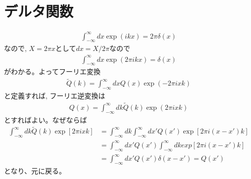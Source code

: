 \documentclass[a4j, 12pt]{ltjarticle}
\begin{document}
    \section{デルタ関数}
    \begin{align}
        \int_{-\infty}^\infty dx \exp\left(ikx\right) = 2\pi\delta(x)
    \end{align}
    なので, $X = 2\pi x$として$dx = X/2\pi$なので
    \begin{align}
        \int_{-\infty}^\infty dx \exp\left(2\pi ikx\right) = \delta(x)
    \end{align}
    がわかる。よってフーリエ変換
    \begin{align}
        \tilde{Q}(k) = \int_{-\infty}^\infty dx Q(x) \exp\left(-2\pi i xk\right)
    \end{align}
    と定義すれば, フーリエ逆変換は
    \begin{align}
        Q(x) = \int_{-\infty}^\infty dk \tilde{Q}(k) \exp\left(2\pi i xk\right)
    \end{align}
    とすればよい。なぜならば
    \begin{align}
        \int_{-\infty}^\infty dk \tilde{Q}(k)
        \exp\left[2\pi ixk\right] &= 
        \int_{-\infty}^\infty dk \int_{-\infty}^\infty dx' Q(x')\exp[2\pi i (x-x')k] \\
        &= \int_{-\infty}^\infty dx' Q(x') \int_{-\infty}^\infty dk exp[2\pi i(x-x')k] \\
        &= \int_{-\infty}^\infty dx' Q(x') \delta(x-x') = Q(x')        
    \end{align}
    となり、元に戻る。
\end{document}
